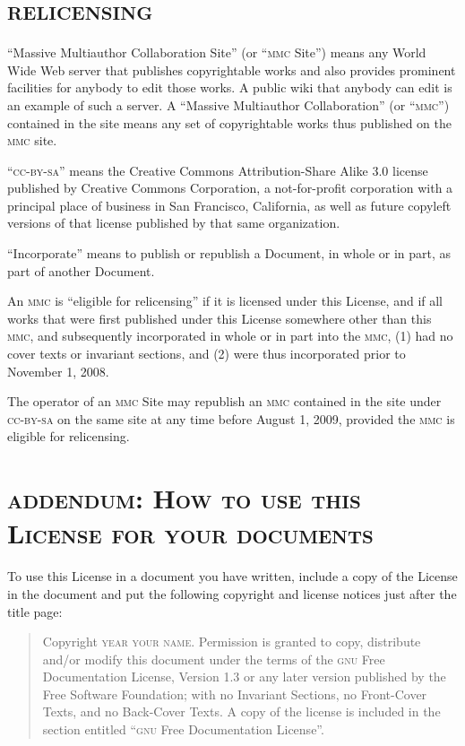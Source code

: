 \section[Relicensing]{\scshape relicensing}

``Massive Multiauthor Collaboration Site'' (or ``\textsc{mmc} Site'') means
any World Wide Web server that publishes copyrightable works and also
provides prominent facilities for anybody to edit those works. A public
wiki that anybody can edit is an example of such a server. A ``Massive
Multiauthor Collaboration'' (or ``\textsc{mmc}'') contained in the site
means any set of copyrightable works thus published on the \textsc{mmc}
site.

``\textsc{cc-by-sa}'' means the Creative Commons Attribution-Share Alike
3.0 license published by Creative Commons Corporation, a not-for-profit
corporation with a principal place of business in San Francisco,
California, as well as future copyleft versions of that license published
by that same organization.

``Incorporate'' means to publish or republish a Document, in whole or in
part, as part of another Document.

An \textsc{mmc} is ``eligible for relicensing'' if it is licensed under
this License, and if all works that were first published under this License
somewhere other than this \textsc{mmc}, and subsequently incorporated in
whole or in part into the \textsc{mmc}, (1) had no cover texts or invariant
sections, and (2) were thus incorporated prior to November 1, 2008.

The operator of an \textsc{mmc} Site may republish an \textsc{mmc}
contained in the site under \textsc{cc-by-sa} on the same site at any time
before August 1, 2009, provided the \textsc{mmc} is eligible for
relicensing.


\section*{\scshape addendum: How to use this License for your documents}

To use this License in a document you have written, include a copy of the
License in the document and put the following copyright and license notices
just after the title page:

{\small\begin{quotation}
	Copyright \textcopyright{}  \textsc{year  your name}. Permission is
	granted to copy, distribute and/or modify this document under the
	terms of the \textsc{gnu} Free Documentation License, Version 1.3
	or any later version published by the Free Software Foundation;
	with no Invariant Sections, no Front-Cover Texts, and no Back-Cover
	Texts.  A copy of the license is included in the section entitled
	``\textsc{gnu} Free Documentation License''.
\end{quotation}}

